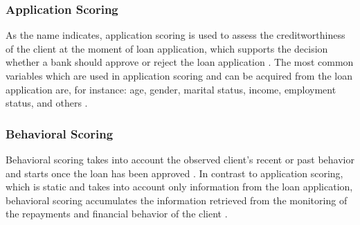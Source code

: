 \subsubsection{Application Scoring}
As the name indicates, application scoring is used to assess the creditworthiness of the client at the moment of loan application,  which supports the decision whether a bank should approve or reject the loan application \citep{baesens2016credit}. The most common variables which are used in application scoring and can be acquired from the loan application are, for instance: age, gender, marital status, income, employment status, and others \citep{baesens2016credit}.
\subsubsection{Behavioral Scoring}
Behavioral scoring takes into account the observed client's recent or past behavior and starts once the loan has been approved \citep{van2009credit}. In contrast to application scoring, which is static and takes into account only information from the loan application, behavioral scoring accumulates the information retrieved from the monitoring of the repayments and financial behavior of the client \citep{van2009credit}.

\newpage
